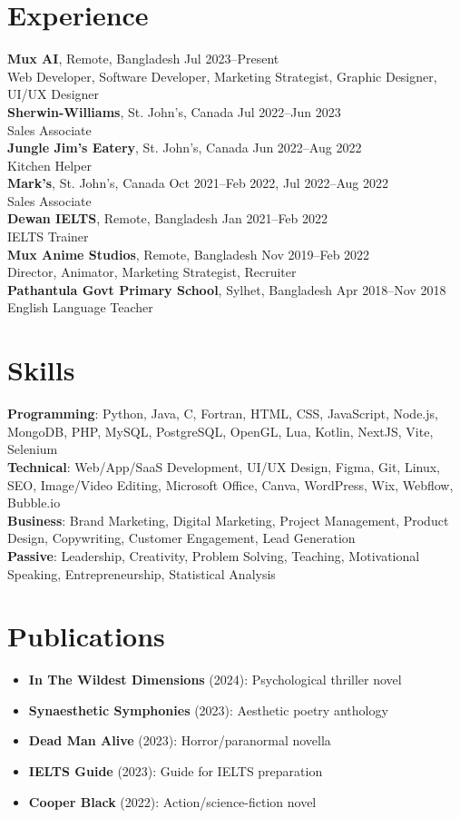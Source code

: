 \documentclass[10pt,letterpaper]{article}
\begin{document}
\section*{Experience}
\textbf{Mux AI}, Remote, Bangladesh \hfill Jul 2023--Present \\
Web Developer, Software Developer, Marketing Strategist, Graphic Designer, UI/UX Designer \\
\textbf{Sherwin-Williams}, St. John's, Canada \hfill Jul 2022--Jun 2023 \\
Sales Associate \\
\textbf{Jungle Jim's Eatery}, St. John's, Canada \hfill Jun 2022--Aug 2022 \\
Kitchen Helper \\
\textbf{Mark's}, St. John's, Canada \hfill Oct 2021--Feb 2022, Jul 2022--Aug 2022 \\
Sales Associate \\
\textbf{Dewan IELTS}, Remote, Bangladesh \hfill Jan 2021--Feb 2022 \\
IELTS Trainer \\
\textbf{Mux Anime Studios}, Remote, Bangladesh \hfill Nov 2019--Feb 2022 \\
Director, Animator, Marketing Strategist, Recruiter \\
\textbf{Pathantula Govt Primary School}, Sylhet, Bangladesh \hfill Apr 2018--Nov 2018 \\
English Language Teacher

\section*{Skills}
\textbf{Programming}: Python, Java, C, Fortran, HTML, CSS, JavaScript, Node.js, MongoDB, PHP, MySQL, PostgreSQL, OpenGL, Lua, Kotlin, NextJS, Vite, Selenium \\
\textbf{Technical}: Web/App/SaaS Development, UI/UX Design, Figma, Git, Linux, SEO, Image/Video Editing, Microsoft Office, Canva, WordPress, Wix, Webflow, Bubble.io \\
\textbf{Business}: Brand Marketing, Digital Marketing, Project Management, Product Design, Copywriting, Customer Engagement, Lead Generation \\
\textbf{Passive}: Leadership, Creativity, Problem Solving, Teaching, Motivational Speaking, Entrepreneurship, Statistical Analysis

\section*{Publications}
\begin{itemize}
    \item \textbf{In The Wildest Dimensions} (2024): Psychological thriller novel
    \item \textbf{Synaesthetic Symphonies} (2023): Aesthetic poetry anthology
    \item \textbf{Dead Man Alive} (2023): Horror/paranormal novella
    \item \textbf{IELTS Guide} (2023): Guide for IELTS preparation
    \item \textbf{Cooper Black} (2022): Action/science-fiction novel
\end{itemize}
\end{document}
